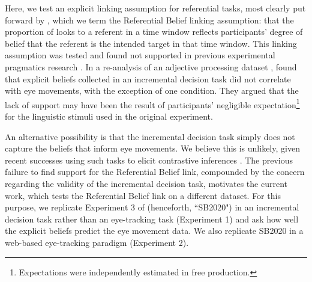 \documentclass[10pt,letterpaper]{article}
\newcommand{\expref}[1]{Experiment #1}
\begin{document}
Here, we test an explicit linking assumption for referential tasks, most clearly put forward by , which we term the Referential Belief linking assumption: that the proportion of looks to a referent in a time window reflects participants' degree of belief that the referent is the intended target in that time window. This linking assumption was tested and found not supported in previous experimental pragmatics research  \cite{QingLD2018}. In a re-analysis of an adjective processing dataset \cite{LeffelXiangKennedy2016:Imprecision-is-Pragmatic-},  found that explicit beliefs collected in an incremental decision task \cite<similar to gating tasks,>{Allopenna1998} did not correlate with eye movements, with the exception of one condition. They argued that the lack of support may have been the result of participants' negligible expectation\footnote{Expectations were independently estimated in free production.}  for  the  linguistic stimuli used in the original experiment.  

An alternative possibility is that the incremental decision task simply does not capture the beliefs that inform eye movements. We believe this is unlikely, given recent successes  using such tasks to elicit contrastive inferences \cite{KreissDegen2020, alsop2018}. The previous failure to find support for the Referential Belief link, compounded by the concern regarding the validity of the incremental decision task, motivates the current work, which tests the Referential Belief link on a different dataset. For this purpose, we replicate \expref{3} of  (henceforth, ``SB2020") in an incremental decision task rather than an eye-tracking task (\expref{1}) and ask how well the explicit beliefs predict the eye movement data. We also replicate SB2020 in a web-based eye-tracking paradigm  (\expref{2}). 
\end{document}
